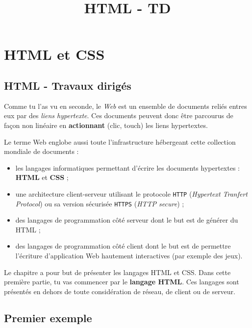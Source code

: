 \documentclass[a4paper,12pt]{article}
\title{HTML - TD}
\providecommand{\tightlist}{%
      \setlength{\itemsep}{0pt}\setlength{\parskip}{0pt}}
\begin{document}
    
    
    




    
    

    
    \hypertarget{html-et-css}{%
\section{HTML et CSS}\label{html-et-css}}

\hypertarget{html---travaux-diriguxe9s}{%
\subsection{HTML - Travaux dirigés}\label{html---travaux-diriguxe9s}}

    Comme tu l'as vu en seconde, le \emph{Web} est un ensemble de documents
reliés entres eux par des \emph{liens hypertexte}. Ces documents peuvent
donc être parcourus de façon non linéaire en \textbf{actionnant} (clic,
touch) les liens hypertextes.

Le terme Web englobe aussi toute l'infrastructure hébergeant cette
collection mondiale de documents :

\begin{itemize}
\tightlist
\item
  les langages informatiques permettant d'écrire les documents
  hypertextes : \textbf{HTML} et \textbf{CSS} ;
\item
  une architecture client-serveur utilisant le protocole \texttt{HTTP}
  (\emph{Hypertext Tranfert Protocol}) ou sa version sécurisée
  \texttt{HTTPS} (\emph{HTTP secure}) ;
\item
  des langages de programmation côté serveur dont le but est de générer
  du HTML ;
\item
  des langages de programmation côté client dont le but est de permettre
  l'écriture d'application Web hautement interactives (par exemple des
  jeux).
\end{itemize}

Le chapitre a pour but de présenter les langages HTML et CSS. Dans cette
première partie, tu vas commencer par le \textbf{langage HTML}. Ces
langages sont présentés en dehors de toute considération de réseau, de
client ou de serveur.

    \hypertarget{premier-exemple}{%
\subsection{Premier exemple}\label{premier-exemple}}
\end{document}
